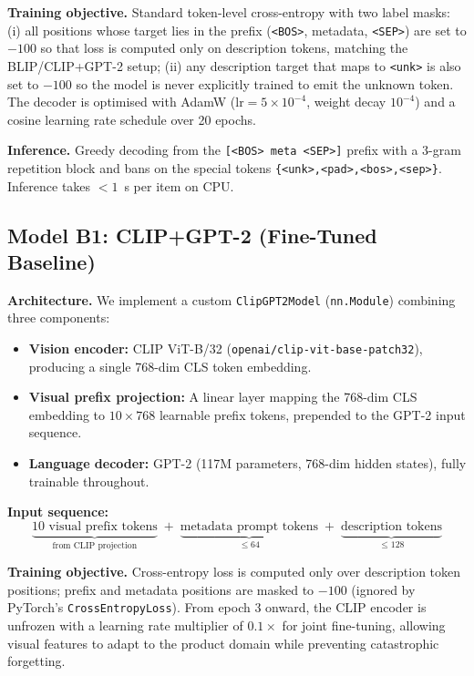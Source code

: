 \documentclass[12pt,a4paper]{article}
\begin{document}
\textbf{Training objective.} Standard token-level cross-entropy with two label
masks: (i) all positions whose target lies in the prefix (\texttt{<BOS>},
metadata, \texttt{<SEP>}) are set to $-100$ so that loss is computed only on
description tokens, matching the BLIP/CLIP+GPT-2 setup; (ii) any description
target that maps to \texttt{<unk>} is also set to $-100$ so the model is never
explicitly trained to emit the unknown token. The decoder is optimised with
AdamW ($\text{lr}=5{\times}10^{-4}$, weight decay $10^{-4}$) and a cosine learning
rate schedule over 20 epochs.

\textbf{Inference.} Greedy decoding from the \texttt{[<BOS> meta <SEP>]} prefix
with a 3-gram repetition block and bans on the special tokens
\texttt{\{<unk>,<pad>,<bos>,<sep>\}}. Inference takes $<\!1$~s per item on CPU.

\subsection{Model B1: CLIP+GPT-2 (Fine-Tuned Baseline)}

\textbf{Architecture.} We implement a custom \texttt{ClipGPT2Model} (\texttt{nn.Module})
combining three components:
\begin{itemize}[noitemsep]
  \item \textbf{Vision encoder:} CLIP ViT-B/32 (\texttt{openai/clip-vit-base-patch32}),
        producing a single 768-dim CLS token embedding.
  \item \textbf{Visual prefix projection:} A linear layer mapping the 768-dim CLS
        embedding to $10 \times 768$ learnable prefix tokens, prepended to the
        GPT-2 input sequence.
  \item \textbf{Language decoder:} GPT-2 (117M parameters, 768-dim hidden states),
        fully trainable throughout.
\end{itemize}

\textbf{Input sequence:}
\[
  \underbrace{\text{10 visual prefix tokens}}_{\text{from CLIP projection}}
  \;+\;
  \underbrace{\text{metadata prompt tokens}}_{\leq 64}
  \;+\;
  \underbrace{\text{description tokens}}_{\leq 128}
\]

\textbf{Training objective.} Cross-entropy loss is computed only over description token
positions; prefix and metadata positions are masked to $-100$ (ignored by PyTorch's
\texttt{CrossEntropyLoss}). From epoch 3 onward, the CLIP encoder is unfrozen with
a learning rate multiplier of $0.1\times$ for joint fine-tuning, allowing visual
features to adapt to the product domain while preventing catastrophic forgetting.
\end{document}
